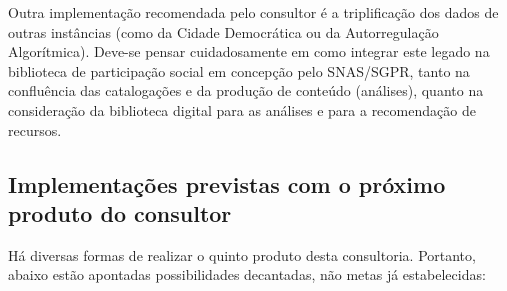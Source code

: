\documentclass[12pt]{article}
\begin{document}
Outra implementação recomendada pelo consultor é a triplificação dos dados de outras instâncias (como da Cidade Democrática ou da Autorregulação Algorítmica). Deve-se pensar cuidadosamente em como integrar este legado na biblioteca de participação social em concepção pelo SNAS/SGPR, tanto na confluência das catalogações e da produção de conteúdo (análises), quanto na consideração da biblioteca digital para as análises e para a recomendação de recursos.

\subsection{Implementações previstas com o próximo produto do consultor}
Há diversas formas de realizar o quinto produto desta consultoria. Portanto, abaixo estão apontadas possibilidades decantadas, não metas já estabelecidas:
\end{document}
